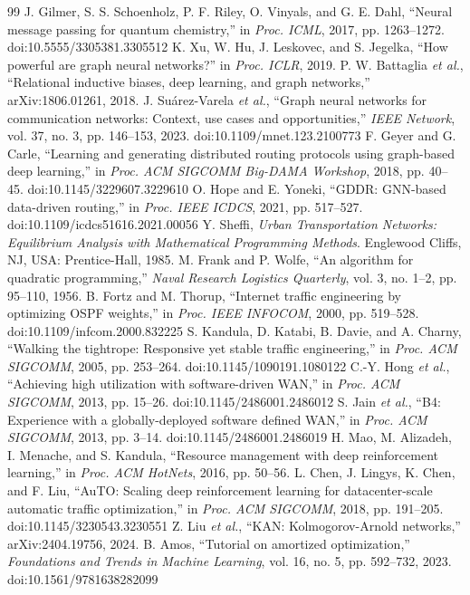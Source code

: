 \documentclass[journal]{IEEEtran}
\begin{document}
\begin{thebibliography}{99}
 J. Gilmer, S. S. Schoenholz, P. F. Riley, O. Vinyals, and G. E. Dahl,
``Neural message passing for quantum chemistry,'' in \emph{Proc. ICML}, 2017, pp. 1263--1272. doi:10.5555/3305381.3305512
 K. Xu, W. Hu, J. Leskovec, and S. Jegelka, ``How powerful are graph neural
networks?'' in \emph{Proc. ICLR}, 2019.
 P. W. Battaglia \emph{et al.}, ``Relational inductive biases, deep
learning, and graph networks,'' arXiv:1806.01261, 2018.
 J. Su\'arez-Varela \emph{et al.}, ``Graph neural networks for
communication networks: Context, use cases and opportunities,'' \emph{IEEE Network}, vol.
37, no. 3, pp. 146--153, 2023. doi:10.1109/mnet.123.2100773
 F. Geyer and G. Carle, ``Learning and generating distributed routing
protocols using graph-based deep learning,'' in \emph{Proc. ACM SIGCOMM Big-DAMA
Workshop}, 2018, pp. 40--45. doi:10.1145/3229607.3229610
 O. Hope and E. Yoneki, ``GDDR: GNN-based data-driven routing,'' in
\emph{Proc. IEEE ICDCS}, 2021, pp. 517--527. doi:10.1109/icdcs51616.2021.00056
 Y. Sheffi, \emph{Urban Transportation Networks: Equilibrium Analysis with
Mathematical Programming Methods}. Englewood Cliffs, NJ, USA: Prentice-Hall, 1985.
 M. Frank and P. Wolfe, ``An algorithm for quadratic programming,''
\emph{Naval Research Logistics Quarterly}, vol. 3, no. 1--2, pp. 95--110, 1956.
 B. Fortz and M. Thorup, ``Internet traffic engineering by optimizing OSPF
weights,'' in \emph{Proc. IEEE INFOCOM}, 2000, pp. 519--528. doi:10.1109/infcom.2000.832225
 S. Kandula, D. Katabi, B. Davie, and A. Charny, ``Walking the tightrope:
Responsive yet stable traffic engineering,'' in \emph{Proc. ACM SIGCOMM}, 2005, pp. 253--264. doi:10.1145/1090191.1080122
 C.-Y. Hong \emph{et al.}, ``Achieving high utilization with software-driven
WAN,'' in \emph{Proc. ACM SIGCOMM}, 2013, pp. 15--26. doi:10.1145/2486001.2486012
 S. Jain \emph{et al.}, ``B4: Experience with a globally-deployed software
defined WAN,'' in \emph{Proc. ACM SIGCOMM}, 2013, pp. 3--14. doi:10.1145/2486001.2486019
 H. Mao, M. Alizadeh, I. Menache, and S. Kandula, ``Resource management
with deep reinforcement learning,'' in \emph{Proc. ACM HotNets}, 2016, pp. 50--56.
 L. Chen, J. Lingys, K. Chen, and F. Liu, ``AuTO: Scaling deep reinforcement
learning for datacenter-scale automatic traffic optimization,'' in \emph{Proc. ACM
SIGCOMM}, 2018, pp. 191--205. doi:10.1145/3230543.3230551
 Z. Liu \emph{et al.}, ``KAN: Kolmogorov-Arnold networks,''
arXiv:2404.19756, 2024.
 B. Amos, ``Tutorial on amortized optimization,'' \emph{Foundations and
Trends in Machine Learning}, vol. 16, no. 5, pp. 592--732, 2023. doi:10.1561/9781638282099
\end{thebibliography}
\end{document}
